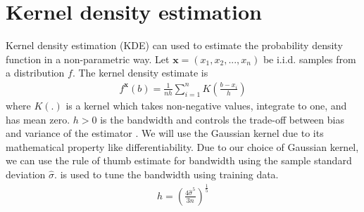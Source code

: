 %

\section{Kernel density estimation}
Kernel density estimation (KDE) can used to estimate the probability density function in a non-parametric way. Let $ \mathbf{x} = \left( x_1, x_2, ..., x_n\right)$ be i.i.d. samples from a distribution $f$. The kernel density estimate is
\begin{align}
    f^\mathbf{x} (b) = \frac{1}{nh} \sum_{i=1}^{n} K\left(\frac{b-x_i}{h}\right) \label{eqn:kde}
\end{align}
where $K(.)$ is a kernel which takes non-negative values, integrate to one, and has mean zero. $h > 0$ is the bandwidth and controls the trade-off between bias and variance of the estimator . We will use the Gaussian kernel due to its mathematical property like differentiability. Due to our choice of Gaussian kernel, we can use the rule of thumb estimate \cite{silverman1986density} for bandwidth using the sample standard deviation $\hat{\sigma}$.  is used to tune the bandwidth using training data.
\begin{align}
    h = \left( \frac{4 \hat{\sigma}^5}{3n}\right)^{\frac{1}{5}} \label{eqn:kdebw}
\end{align}

